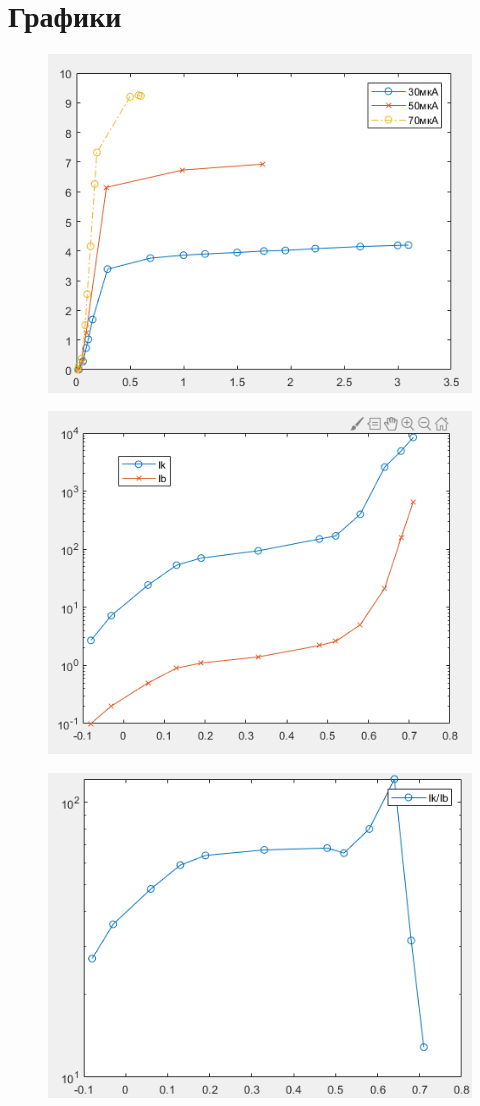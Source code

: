 \documentclass[a4paper,14pt]{article}
\begin{document}
\section{Графики}

\begin{figure}
	\centering
	\includegraphics[width=0.7\linewidth]{images/graf1}
	\caption{}
	\label{fig:graf1}
\end{figure}



\begin{figure}
	\centering
	\includegraphics[width=0.7\linewidth]{images/graf2}
	\caption{}
	\label{fig:graf2}
\end{figure}


\begin{figure}
	\centering
	\includegraphics[width=0.7\linewidth]{images/graf3}
	\caption{}
	\label{fig:graf3}
\end{figure}
\end{document}
